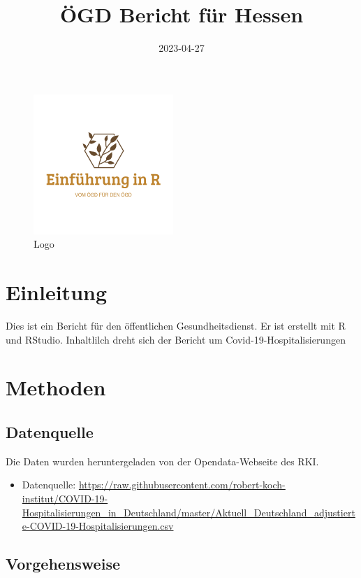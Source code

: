 \documentclass[
]{article}
\title{ÖGD Bericht für Hessen}
\author{}
\date{\vspace{-2.5em}2023-04-27}
\providecommand{\tightlist}{%
  \setlength{\itemsep}{0pt}\setlength{\parskip}{0pt}}
\begin{document}
\maketitle

\begin{figure}
\centering
\includegraphics{logo2.png}
\caption{Logo}
\end{figure}

\hypertarget{einleitung}{%
\section{Einleitung}\label{einleitung}}

Dies ist ein Bericht für den öffentlichen Gesundheitsdienst. Er ist
erstellt mit R und RStudio. Inhaltlilch dreht sich der Bericht um
Covid-19-Hospitalisierungen

\hypertarget{methoden}{%
\section{Methoden}\label{methoden}}

\hypertarget{datenquelle}{%
\subsection{Datenquelle}\label{datenquelle}}

Die Daten wurden heruntergeladen von der Opendata-Webseite des RKI.

\begin{itemize}
\tightlist
\item
  Datenquelle:
  \url{https://raw.githubusercontent.com/robert-koch-institut/COVID-19-Hospitalisierungen_in_Deutschland/master/Aktuell_Deutschland_adjustierte-COVID-19-Hospitalisierungen.csv}
\end{itemize}

\hypertarget{vorgehensweise}{%
\subsection{Vorgehensweise}\label{vorgehensweise}}
\end{document}
